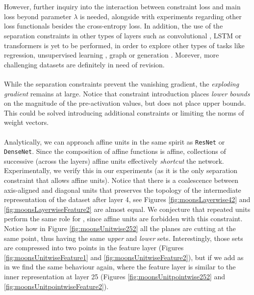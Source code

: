 \\\\
However, further inquiry into the interaction between constraint loss and main loss beyond parameter $\lambda$ is needed, alongside with experiments regarding other loss functionals besides the cross-entropy loss. In addition,  the use of the separation constraints in other types of layers such as convolutional \cite{lenet}, LSTM \cite{lstm} or transformers \cite{transformer}\cite{transformer2} is yet to be performed, in order to explore other types of tasks like regression, unsupervised learning \cite{embedding}, graph \cite{graph} or generation \cite{gan,vae}. Morever, more challenging datasets are definitely in need of revision.
\\\\
While the separation constraints prevent the vanishing gradient, the \emph{exploding gradient} remains at large. Notice that constraint introduction places \emph{lower bounds} on the magnitude of the pre-activation values, but does not place upper bounds. This could be solved introducing additional constraints or limiting the norms of weight vectors. 
\\\\
Analytically, we can approach affine units in the same spirit as \texttt{ResNet} \cite{resnet} or \texttt{DenseNet}\cite{densenet}. Since the composition of affine functions is affine, collections of successive (across the layers) affine units effectively \emph{shortcut} the network. Experimentally, we verify this in our \SepLayer experiments (as it is the only separation constraint that allows affine units). Notice that there is a coalescence between axis-aligned and diagonal units that preserves the topology of the intermediate representation of the dataset after layer 4, see Figures \ref{fig:moonsLayerwise42} and \ref{fig:moonsLayerwiseFeature2} are almost equal. We conjecture that repeated units perform the same role for \SepUnit, since affine units are forbidden with this constraint. Notice how in Figure \ref{fig:moonsUnitwise252} all the planes are cutting at the same point, thus having the same \emph{upper} and \emph{lower} sets. Interestingly, those sets are compressed into two points in the feature layer (Figures \ref{fig:moonsUnitwiseFeature1} and \ref{fig:moonsUnitwiseFeature2}), but if we add \SepPoint as in \SepUnitPoint we find the same behaviour again, where the feature layer is similar to the inner representation at layer 25 (Figures \ref{fig:moonsUnitpointwise252} and \ref{fig:moonsUnitpointwiseFeature2}). 
